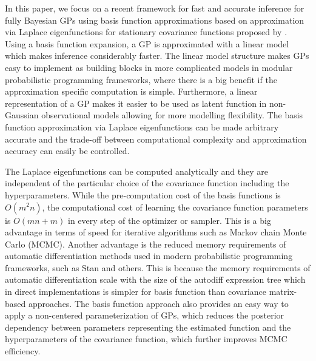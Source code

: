 In this paper, we focus on a recent framework for fast and accurate inference for fully Bayesian GPs using basis function approximations based on approximation via Laplace eigenfunctions for stationary covariance functions proposed by \citet{solin2018hilbert}. Using a basis function expansion, a GP is approximated with a linear model which makes inference considerably faster. The linear model structure makes GPs easy to implement as building blocks in more complicated models in modular probabilistic programming frameworks, where there is a big benefit if the approximation specific computation is simple. Furthermore, a linear representation of a GP makes it easier to be used as latent function in non-Gaussian observational models allowing for more modelling flexibility. The basis function approximation via Laplace eigenfunctions can be made arbitrary accurate and the trade-off between computational complexity and approximation accuracy can easily be controlled.

The Laplace eigenfunctions can be computed analytically and they are independent of the particular choice of the covariance function including the hyperparameters. While the pre-computation cost of the basis functions is $O(m^2n)$, the computational cost of learning the covariance function parameters is $O(mn+m)$ in every step of the optimizer or sampler. This is a big advantage in terms of speed for iterative algorithms such as Markov chain Monte Carlo (MCMC). Another advantage is the reduced memory requirements of automatic differentiation methods used in modern probabilistic programming frameworks, such as Stan \citep{carpenter2017stan} and others. This is because the memory requirements of automatic differentiation scale with the size of the autodiff expression tree which in direct implementations is simpler for basis function than covariance matrix-based approaches. The basis function approach also provides an easy way to apply a non-centered parameterization of GPs, which reduces the posterior dependency between parameters representing the estimated function and the hyperparameters of the covariance function, which further improves MCMC efficiency.

